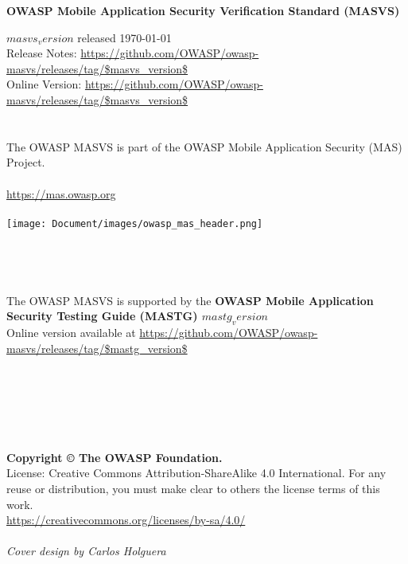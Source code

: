 \thispagestyle{empty} %

\textbf{OWASP Mobile Application Security Verification Standard (MASVS)}

$masvs_version$ released \today \\

Release Notes: \url{https://github.com/OWASP/owasp-masvs/releases/tag/$masvs_version$} \\

Online Version: \url{https://github.com/OWASP/owasp-masvs/releases/tag/$masvs_version$} \\ \\ \\


The OWASP MASVS is part of the OWASP Mobile Application Security (MAS) Project. \\ \\

\url{https://mas.owasp.org} \\ \\

\texttt{[image: Document/images/owasp\_mas\_header.png]} \\ \\ \\ \\ \\



The OWASP MASVS is supported by the \textbf{OWASP Mobile Application Security Testing Guide (MASTG) $mastg_version$} \\

Online version available at \url{https://github.com/OWASP/owasp-masvs/releases/tag/$mastg_version$} \\ \\ \\ \\ \\ \\ \\
 


\textbf{Copyright © The OWASP Foundation.} \\

License: Creative Commons Attribution-ShareAlike 4.0 International.
For any reuse or distribution, you must make clear to others the license terms of this work. \\
\url{https://creativecommons.org/licenses/by-sa/4.0/} \\ \\


\emph{Cover design by Carlos Holguera}